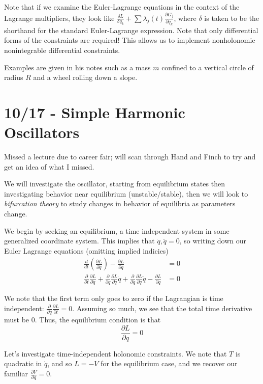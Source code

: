 \documentclass[10pt]{report}
\newcommand{\rd}[2]{\frac{d#1}{d#2}}
\newcommand{\pd}[2]{\frac{\partial #1}{\partial#2}}
\begin{document}
Note that if we examine the Euler-Lagrange equations in the context of the Lagrange multipliers, they look like $\frac{\delta L}{\delta q_k} + \sum \lambda_j(t) \pd{G_j}{q_k}$, where $\delta$ is taken to be the shorthand for the standard Euler-Lagrange expression. Note that only differential forms of the constraints are required! This allows us to implement nonholonomic nonintegrable differential constraints.

Examples are given in his notes such as a mass $m$ confined to a vertical circle of radius $R$ and a wheel rolling down a slope. 
\chapter{10/17 - Simple Harmonic Oscillators}

Missed a lecture due to career fair; will scan through Hand and Finch to try and get an idea of what I missed.

We will investigate the oscillator, starting from equilibrium states then investigating behavior near equilibrium (unstable/stable), then we will look to \emph{bifurcation theory} to study changes in behavior of equilibria as parameters change. 

We begin by seeking an equilibrium, a time independent system in some generalized coordinate system. This implies that $\dot{q},\ddot{q} = 0$, so writing down our Euler Lagrange equations (omitting implied indicies)
\begin{align*}
    \rd{}{t}\left( \pd{L}{\dot{q}} \right) - \pd{L}{q} &= 0\\
    \pd{}{t}\pd{L}{\dot{q}} + \pd{}{q}\pd{L}{\dot{q}}\dot{q} + \pd{}{\dot{q}}\pd{L}{\dot{q}}\ddot{q} - \pd{L}{q} &= 0
\end{align*}

We note that the first term only goes to zero if the Lagrangian is time independent: $\pd{}{q}\pd{L}{t} = 0$. Assuming so much, we see that the total time derivative must be $0$. Thus, the equilibrium condition is that
$$\pd{L}{q} = 0$$

Let's investigate time-independent holonomic constraints. We note that $T$ is quadratic in $\dot{q}$, and so $L = -V$ for the equilibrium case, and we recover our familiar $\pd{V}{q} = 0$. 
\end{document}
